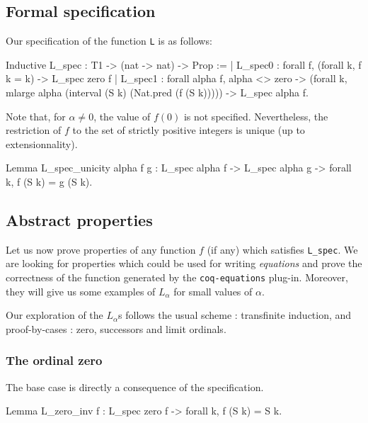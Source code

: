 \documentclass[a4paper]{book}
\begin{document}
\subsection{Formal specification}

Our specification of the function \texttt{L} is as follows:

\begin{Coqsrc}
Inductive L_spec : T1 -> (nat -> nat) -> Prop :=
| L_spec0 : forall f, (forall k, f k = k) ->  L_spec zero f
| L_spec1 : forall alpha f,
    alpha <> zero ->
    (forall k, mlarge alpha (interval (S k) (Nat.pred (f (S k))))) ->
    L_spec alpha f.
\end{Coqsrc}


Note that, for $\alpha\not=0$, the value of $f(0)$ is not specified.
Nevertheless, the restriction of $f$ to the set of strictly positive integers is unique (up to extensionnality).

\begin{Coqsrc}
Lemma L_spec_unicity alpha f g :
  L_spec alpha f -> L_spec alpha g -> forall k, f (S k) = g (S k).
\end{Coqsrc}


\subsection{Abstract properties}



Let us now prove properties of any function $f$ (if any) which satisfies 
\texttt{L\_spec}. We are looking for properties which could be used for writing \emph{equations} and prove the correctness of the function generated by the \texttt{coq-equations} plug-in. Moreover, they will give us some examples of
$L_\alpha$ for small values of $\alpha$. 


Our exploration of the $L_\alpha$s  follows the usual scheme : transfinite induction, and proof-by-cases : zero, successors and limit ordinals.


\subsubsection{The  ordinal zero}
\label{sect:L-spec-zero}
The base case is directly a consequence of the specification.

\begin{Coqsrc}
Lemma L_zero_inv f : L_spec zero f -> forall k, f (S k) = S k.
\end{Coqsrc}
\end{document}
